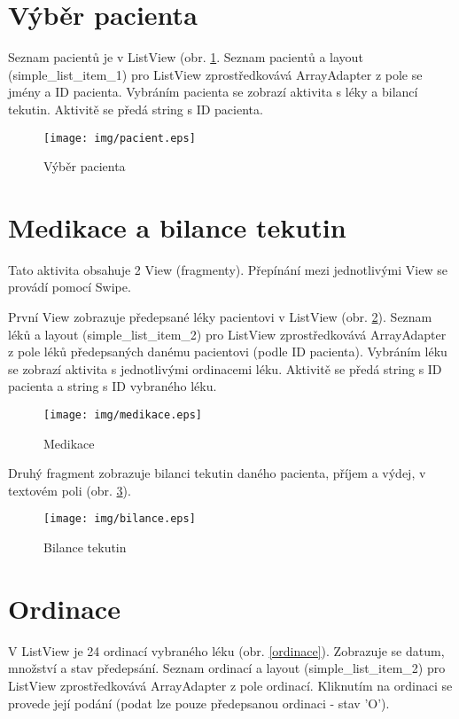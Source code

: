 \section{Výběr pacienta}

Seznam pacientů je v ListView (obr. \ref{pacient}. Seznam pacientů a layout (simple\_list\_item\_1) pro ListView zprostředkovává ArrayAdapter z pole se jmény a ID pacienta. Vybráním pacienta se zobrazí aktivita s léky a bilancí tekutin. Aktivitě se předá string s ID pacienta.

\begin{figure}[H]
	\centering
	\texttt{[image: img/pacient.eps]}
	\caption{Výběr pacienta}
  \label{pacient}
\end{figure}

\section{Medikace a bilance tekutin}

Tato aktivita obsahuje 2 View (fragmenty). Přepínání mezi jednotlivými View se provádí pomocí Swipe.

První View zobrazuje předepsané léky pacientovi v ListView (obr. \ref{medikace}). Seznam léků  a layout (simple\_list\_item\_2) pro ListView zprostředkovává ArrayAdapter z pole léků předepsaných danému pacientovi (podle ID pacienta). Vybráním léku se zobrazí aktivita s jednotlivými ordinacemi léku. Aktivitě se předá string s ID pacienta a string s ID vybraného léku.

\begin{figure}[H]
	\centering
	\texttt{[image: img/medikace.eps]}
	\caption{Medikace}
  \label{medikace}
\end{figure}

Druhý fragment zobrazuje bilanci tekutin daného pacienta, příjem a výdej, v textovém poli (obr. \ref{bilance}).

\begin{figure}[H]
	\centering
	\texttt{[image: img/bilance.eps]}
	\caption{Bilance tekutin}
  \label{bilance}
\end{figure}


\section{Ordinace}

V ListView je 24 ordinací vybraného léku (obr. \ref{ordinace}). Zobrazuje se datum, množství a stav předepsání. Seznam ordinací  a layout (simple\_list\_item\_2) pro ListView zprostředkovává ArrayAdapter z pole ordinací. Kliknutím na ordinaci se provede její podání (podat lze pouze předepsanou ordinaci - stav 'O').

